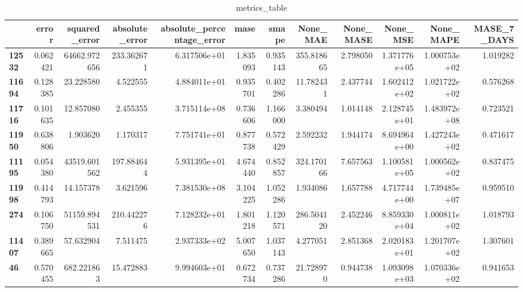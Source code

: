 \begin{table}[h]
\centering
\caption{metrics_table}
\label{table:Experiment with CNN AE and LSTM hybrid method. Local, multivariate, dataset 2. Tuned with LSTM Local Multivariate dataset 2}
\begin{tabular}{lrrrrrrrrrrr}
\toprule
{} &     error &  squared\_error &  absolute\_error &  absolute\_percentage\_error &      mase &     smape &     None\_MAE &  None\_MASE &      None\_MSE &     None\_MAPE &  MASE\_7\_DAYS \\
\midrule
\textbf{12532} &  0.062421 &   64662.972656 &      233.362671 &               6.317506e+01 &  1.835093 &  0.935143 &   355.818665 &   2.798050 &  1.371776e+05 &  1.000753e+02 &     1.019282 \\
\textbf{11694} &  0.128385 &      23.228580 &        4.522555 &               4.884011e+01 &  0.935701 &  0.402286 &    11.782431 &   2.437744 &  1.602412e+02 &  1.021722e+02 &     0.576268 \\
\textbf{11716} &  0.101635 &      12.857080 &        2.455355 &               3.715114e+08 &  0.736606 &  1.166000 &     3.380494 &   1.014148 &  2.128745e+01 &  1.483972e+08 &     0.723521 \\
\textbf{11950} &  0.638806 &       1.903620 &        1.170317 &               7.751741e+01 &  0.877738 &  0.572429 &     2.592232 &   1.944174 &  8.694964e+00 &  1.427243e+02 &     0.471617 \\
\textbf{11195} &  0.054380 &   43519.601562 &      197.884644 &               5.931395e+01 &  4.674440 &  0.852857 &   324.170166 &   7.657563 &  1.100581e+05 &  1.000562e+02 &     0.837475 \\
\textbf{11998} &  0.414793 &      14.157378 &        3.621596 &               7.381530e+08 &  3.104225 &  1.052286 &     1.934086 &   1.657788 &  4.717744e+00 &  1.739485e+07 &     0.959510 \\
\textbf{274  } &  0.106750 &   51159.894531 &      210.442276 &               7.128232e+01 &  1.801218 &  1.120571 &   286.504120 &   2.452246 &  8.859330e+04 &  1.000811e+02 &     1.018793 \\
\textbf{11407} &  0.389665 &      57.632904 &        7.511475 &               2.937333e+02 &  5.007650 &  1.037143 &     4.277051 &   2.851368 &  2.020183e+01 &  1.201707e+02 &     1.307601 \\
\textbf{46   } &  0.570455 &     682.221863 &       15.472883 &               9.994603e+01 &  0.672734 &  0.737286 &    21.728970 &   0.944738 &  1.093098e+03 &  1.070336e+02 &     0.941653 \\

\end{tabular}
\end{table}
